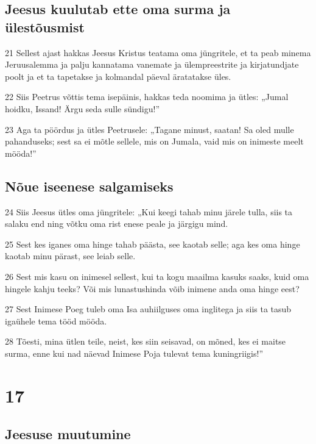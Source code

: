 \section*{Jeesus kuulutab ette oma surma ja ülestõusmist}

\par 21 Sellest ajast hakkas Jeesus Kristus teatama oma jüngritele, et ta peab minema Jeruusalemma ja palju kannatama vanemate ja ülempreestrite ja kirjatundjate poolt ja et ta tapetakse ja kolmandal päeval äratatakse üles.
\par 22 Siis Peetrus võttis tema isepäinis, hakkas teda noomima ja ütles: „Jumal hoidku, Issand! Ärgu seda sulle sündigu!”
\par 23 Aga ta pöördus ja ütles Peetrusele: „Tagane minust, saatan! Sa oled mulle pahanduseks; sest sa ei mõtle sellele, mis on Jumala, vaid mis on inimeste meelt mööda!”

\section*{Nõue iseenese salgamiseks}

\par 24 Siis Jeesus ütles oma jüngritele: „Kui keegi tahab minu järele tulla, siis ta salaku end ning võtku oma rist enese peale ja järgigu mind.
\par 25 Sest kes iganes oma hinge tahab päästa, see kaotab selle; aga kes oma hinge kaotab minu pärast, see leiab selle.
\par 26 Sest mis kasu on inimesel sellest, kui ta kogu maailma kasuks saaks, kuid oma hingele kahju teeks? Või mis lunastushinda võib inimene anda oma hinge eest?
\par 27 Sest Inimese Poeg tuleb oma Isa auhiilguses oma inglitega ja siis ta tasub igaühele tema tööd mööda.
\par 28 Tõesti, mina ütlen teile, neist, kes siin seisavad, on mõned, kes ei maitse surma, enne kui nad näevad Inimese Poja tulevat tema kuningriigis!”


\chapter{17}

\section*{Jeesuse muutumine}

